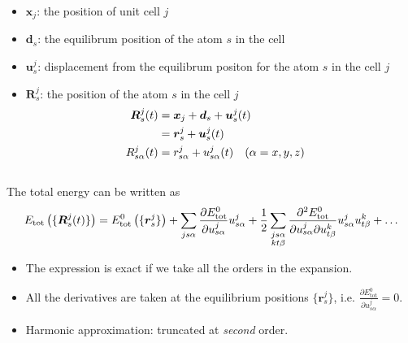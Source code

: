 \begin{frame}
\begin{columns}
    \begin{column}{0.45\textwidth}
      \begin{itemize}
      \item $\boldsymbol{x}_j$: the position of unit cell $j$
      \item $\boldsymbol{d}_s$: the equilibrum position of the atom $s$ in the cell
      \item $\boldsymbol{u}^j_s$: displacement from the equilibrum positon for the atom $s$ in the cell $j$
      \item $\boldsymbol{R}^j_s$: the position of the atom $s$ in the cell $j$
        \begin{align*}
          \boldsymbol{R}^j_s(t) &= \boldsymbol{x}_j + \boldsymbol{d}_s
                                + \boldsymbol{u}^j_s(t) \cr
                                  &= \boldsymbol{r}^j_s + \boldsymbol{u}^j_s(t)  \cr
          {R}_{s\alpha}^j(t) &= {r}_{s\alpha}^j + {u}_{s\alpha}^j(t) 
          \quad (\alpha= x,y,z)
        \end{align*}
      \end{itemize}
    \end{column}
  \end{columns}

  \bigskip
  The total energy can be written as
  \begin{equation*}
    E_{\text{tot}}\left(\{\boldsymbol{R}^j_s(t)\}\right) = 
    E^0_{\text{tot}}\left(\{\boldsymbol{r}^j_s\}\right) +
    \sum_{js\alpha} \frac{
      \partial E^0_{\text{tot}} %
    }{
      \partial {u}_{s\alpha}^j
    } {{u}_{s\alpha}^j} +
    {1\over2} \sum_{\substack{js\alpha \\ kt\beta}}
    \frac{
      \partial^2 E^0_{\text{tot}} %
    }{
      \partial {u}_{s\alpha}^j
      \partial {u}_{t\beta}^k
    } \tikzmark{IFC}
    {{u}_{s\alpha}^j} {{u}_{t\beta}^k}
    + \ldots
  \end{equation*}
  \vspace{-6pt}


  \begin{itemize}
  \item The expression is exact if we take all the orders in the expansion.
  \item All the derivatives are taken at the equilibrium positions
    $\{\boldsymbol{r}^j_s\}$, i.e. $
    \frac{
      \partial E^0_{\text{tot}}
    }{
      \partial
      {u}_{s\alpha}^j
    }=0$. 
  \item Harmonic approximation: truncated at \emph{second} order.
  \end{itemize}
\end{frame}